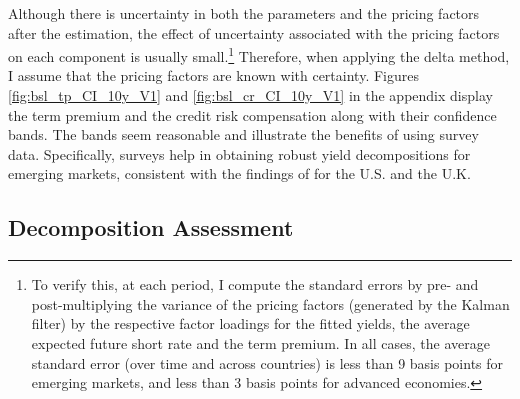 {%
Although there is uncertainty in both the parameters and the pricing factors after the estimation, the effect of uncertainty associated with the pricing factors on each component is usually small.\footnote{ To verify this, at each period, I compute the standard errors by pre- and post-multiplying the variance of the pricing factors (generated by the Kalman filter) by the respective factor loadings for the fitted yields, the average expected future short rate and the term premium. In all cases, the average standard error (over time and across countries) is less than 9 basis points for emerging markets, and less than 3 basis points for advanced economies.}
Therefore, when applying the delta method, I assume that the pricing factors are known with certainty. %
Figures \ref{fig:bsl_tp_CI_10y_V1} and \ref{fig:bsl_cr_CI_10y_V1} in the appendix display the term premium and the credit risk compensation along with their confidence bands. The bands seem reasonable and illustrate the benefits of using survey data. 
Specifically, surveys help in obtaining robust yield decompositions for emerging markets, consistent with the findings of \cite{Guimaraes:2014} for the U.S. and the U.K.


\subsection{Decomposition Assessment}
\iftoggle{toclinks}{\gototoc}{} %


%	

}
